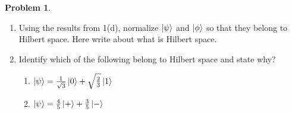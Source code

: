 \documentclass[10pt]{article}
\theoremstyle{definition}
\newtheorem{problem}{Problem}
\begin{document}
\begin{problem}~
\begin{enumerate}[label=(\alph*)]
  \item Using the results from 1(d), normalize $\ket{\psi}$ and $\ket{\phi}$ so that they belong to Hilbert space. Here write about what is Hilbert space.
  \item Identify which of the following belong to Hilbert space and state why?
        \begin{enumerate}[label=(\roman*)]
          \item $\ket{\psi}=\frac{1}{\sqrt{3}}\ket{0}+\sqrt{\frac{2}{3}}\ket{1}$
          \item $\ket{\psi}=\frac{4}{5}\ket{+}+\frac{3}{5}\ket{-}$
        \end{enumerate}
\end{enumerate}
\end{problem}
\end{document}
